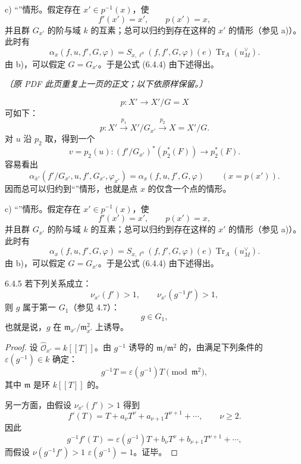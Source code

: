 \textup{c)} “”情形。假定存在 $x'\in p^{-1}(x)$，使
\[
f'(x')=x',\qquad p(x')=x,
\]
并且群 $G_{x'}$ 的阶与域 $k$ 的互素；总可以归约到存在这样的 $x'$ 的情形（参见 a)）。此时有
\[
\alpha_x(f,u,f',G,\varphi)
=S_{x,\ell^n}(f,f',G,\varphi)(e)\operatorname{Tr}_A(u_M^\vee).
\tag{6.4.4}
\]
由 b)，可以假定 $G=G_{x'}$。于是公式 (6.4.4) 由下述得出。

\textit{〔原 PDF 此页重复上一页的正文；以下依原样保留。〕}

\[
p:X'\longrightarrow X'/G=X
\]
可如下：
\[
p:X'\xrightarrow{p_1}X'/G_{x'}\xrightarrow{p_2}X=X'/G.
\]
对 $u$ 沿 $p_2$ 取，得到一个
\[
v=p_2(u):(f'/G_{x'})^*(p_2^*(F))\longrightarrow p_2^*(F).
\]
容易看出
\[
\alpha_{\bar x'}(f'/G_{x'},u,f',G_{x'},\varphi_{x'})
=\alpha_x(f,u,f',G,\varphi)\qquad(x=p(x')).
\tag{6.4.3}
\]
因而总可以归约到“”情形，也就是点 $x$ 的仅含一个点的情形。

\textup{c)} “”情形。假定存在 $x'\in p^{-1}(x)$，使
\[
f'(x')=x',\qquad p(x')=x,
\]
并且群 $G_{x'}$ 的阶与域 $k$ 的互素；总可以归约到存在这样的 $x'$ 的情形（参见 a)）。此时有
\[
\alpha_x(f,u,f',G,\varphi)
=S_{x,\ell^n}(f,f',G,\varphi)(e)\operatorname{Tr}_A(u_M^\vee).
\tag{6.4.4}
\]
由 b)，可以假定 $G=G_{x'}$。于是公式 (6.4.4) 由下述得出。

\begin{SGAresult}{}{6.4.5}
若下列关系成立：
\[
\nu_{x'}(f')>1,\qquad\nu_{x'}(g^{-1}f')>1,
\]
则 $g$ 属于第一 $G_1$（参见 4.7）：
\[
g\in G_1,
\]
也就是说，$g$ 在 $\mathfrak m_{x'}/\mathfrak m_{x'}^2$ 上诱导。
\end{SGAresult}
\begin{proof}
设 $\widehat{\mathscr O}_{x'}=k[[T]]$。由 $g^{-1}$ 诱导的 $\mathfrak m/\mathfrak m^2$ 的，由满足下列条件的 $\varepsilon(g^{-1})\in k$ 确定：
\[
g^{-1}T=\varepsilon(g^{-1})T\pmod{\mathfrak m^2},
\]
其中 $\mathfrak m$ 是环 $k[[T]]$ 的。

另一方面，由假设 $\nu_{x'}(f')>1$ 得到
\[
f'(T)=T+a_\nu T^\nu+a_{\nu+1}T^{\nu+1}+\cdots,\qquad\nu\geq2.
\]
因此
\[
g^{-1}f'(T)=\varepsilon(g^{-1})T+b_\nu T^\nu+b_{\nu+1}T^{\nu+1}+\cdots,
\]
而假设 $\nu(g^{-1}f')>1$  $\varepsilon(g^{-1})=1$。证毕。
\end{proof}

